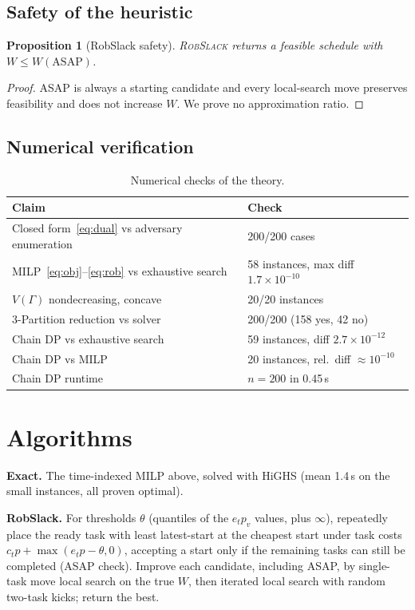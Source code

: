 \documentclass[conference,11pt]{IEEEtran}
\newtheorem{proposition}{Proposition}
\theoremstyle{definition}\newtheorem{remark}{Remark}
\begin{document}
\subsection{Safety of the heuristic}
\begin{proposition}[RobSlack safety]\label{prop:safe}
\textsc{RobSlack} returns a feasible schedule with $W\le W(\mathrm{ASAP})$.
\end{proposition}
\begin{proof}
ASAP is always a starting candidate and every local-search move preserves feasibility and does not increase $W$. We prove no approximation ratio.
\end{proof}

\subsection{Numerical verification}
\begin{table}[t]\centering\caption{Numerical checks of the theory.}\label{tab:checks}
\footnotesize\setlength{\tabcolsep}{3pt}
\begin{tabular}{p{}p{}}\toprule
Claim & Check\\\midrule
Closed form~\eqref{eq:dual} vs adversary enumeration & 200/200 cases\\
MILP~\eqref{eq:obj}--\eqref{eq:rob} vs exhaustive search & 58 instances, max diff $1.7\times10^{-10}$\\
$V(\Gamma)$ nondecreasing, concave & 20/20 instances\\
3-Partition reduction vs solver & 200/200 (158 yes, 42 no)\\
Chain DP vs exhaustive search & 59 instances, diff $2.7\times10^{-12}$\\
Chain DP vs MILP & 20 instances, rel.\ diff $\approx10^{-10}$\\
Chain DP runtime & $n=200$ in 0.45\,s\\\bottomrule\end{tabular}\end{table}

\section{Algorithms}
\textbf{Exact.} The time-indexed MILP above, solved with HiGHS (mean 1.4\,s on the small instances, all proven optimal).

\textbf{RobSlack.} For thresholds $\theta$ (quantiles of the $e_tp_v$ values, plus $\infty$), repeatedly place the ready task with least latest-start at the cheapest start under task costs $c_tp+\max(e_tp-\theta,0)$, accepting a start only if the remaining tasks can still be completed (ASAP check). Improve each candidate, including ASAP, by single-task move local search on the true $W$, then iterated local search with random two-task kicks; return the best.
\end{document}
